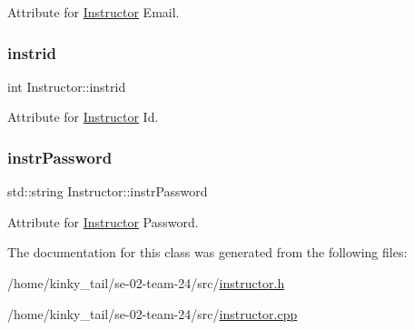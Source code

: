 Attribute for \hyperlink{class_instructor}{Instructor} Email. 

\mbox{\label{class_instructor_a4dde1d72f984b0530250cde154c66d96}} 
\subsubsection{\texorpdfstring{instrid}{instrid}}
{\footnotesize\ttfamily int Instructor\+::instrid\hspace{0.3cm}{\ttfamily [private]}}



Attribute for \hyperlink{class_instructor}{Instructor} Id. 

\mbox{\label{class_instructor_aa2550f7fbea278158c928f86c7fc420f}} 
\subsubsection{\texorpdfstring{instr\+Password}{instrPassword}}
{\footnotesize\ttfamily std\+::string Instructor\+::instr\+Password\hspace{0.3cm}{\ttfamily [private]}}



Attribute for \hyperlink{class_instructor}{Instructor} Password. 



The documentation for this class was generated from the following files\+:\begin{DoxyCompactItemize}
\item 
/home/kinky\+\_\+tail/se-\/02-\/team-\/24/src/\hyperlink{instructor_8h}{instructor.\+h}\item 
/home/kinky\+\_\+tail/se-\/02-\/team-\/24/src/\hyperlink{instructor_8cpp}{instructor.\+cpp}\end{DoxyCompactItemize}
